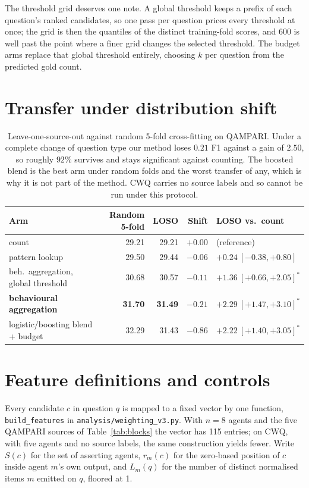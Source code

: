 \documentclass[11pt]{article}
\begin{document}
The threshold grid deserves one note. A global threshold keeps a prefix of each question's ranked candidates, so one pass per question prices every threshold at once; the grid is then the quantiles of the distinct training-fold scores, and 600 is well past the point where a finer grid changes the selected threshold. The budget arms replace that global threshold entirely, choosing $k$ per question from the predicted gold count.

\section{Transfer under distribution shift}
\label{app:proc}

\begin{table}[t]
  \caption{Leave-one-source-out against random 5-fold cross-fitting on QAMPARI. Under a complete change of question type our method loses $0.21$ F1 against a gain of $2.50$, so roughly $92\%$ survives and stays significant against counting. The boosted blend is the best arm under random folds and the worst transfer of any, which is why it is not part of the method. CWQ carries no source labels and so cannot be run under this protocol.}
  \label{tab:loso}
  \centering
  \begin{tabular}{lrrrl}
    \toprule
    Arm & Random 5-fold & LOSO & Shift & LOSO vs.\ count \\
    \midrule
    count                        & 29.21 & 29.21 & $+0.00$ & (reference) \\
    pattern lookup               & 29.50 & 29.44 & $-0.06$ & $+0.24\ [-0.38,+0.80]$ \\
    beh.\ aggregation, global threshold & 30.68 & 30.57 & $-0.11$ & $+1.36\ [+0.66,+2.05]^*$ \\
    \textbf{behavioural aggregation} & \textbf{31.70} & \textbf{31.49} & $\mathbf{-0.21}$ & $\mathbf{+2.29\ [+1.47,+3.10]^*}$ \\
    logistic/boosting blend + budget & 32.29 & 31.43 & $-0.86$ & $+2.22\ [+1.40,+3.05]^*$ \\
    \bottomrule
  \end{tabular}
\end{table}

\section{Feature definitions and controls}
\label{app:features}

Every candidate $c$ in question $q$ is mapped to a fixed vector by one function, \texttt{build\_features} in \texttt{analysis/weighting\_v3.py}. With $n=8$ agents and the five QAMPARI sources of Table~\ref{tab:blocks} the vector has 115 entries; on CWQ, with five agents and no source labels, the same construction yields fewer. Write $S(c)$ for the set of asserting agents, $r_m(c)$ for the zero-based position of $c$ inside agent $m$'s own output, and $L_m(q)$ for the number of distinct normalised items $m$ emitted on $q$, floored at 1.
\end{document}
